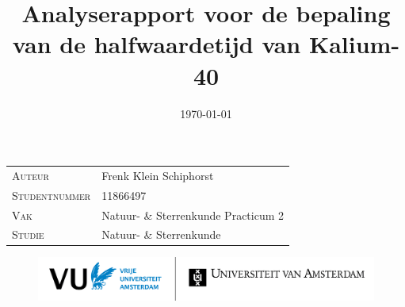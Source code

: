 \documentclass[11pt,a4paper]{article}
\title{Analyserapport voor de bepaling van de halfwaardetijd van Kalium-40} %
\date{\today}
\begin{document}
\begin{titlepage}
\maketitle
\thispagestyle{empty} %

\vfill


 \begin{table}[h]
  \label{tab:credits}
  \begin{tabular}{l l}
   \textsc{Auteur} & Frenk Klein Schiphorst \\
   \textsc{Studentnummer}  & 11866497 \\ %
   \textsc{Vak} & Natuur- \& Sterrenkunde Practicum 2 \\
   \textsc{Studie} & Natuur- \& Sterrenkunde\\
  \end{tabular}
  \vspace{3ex}
 \end{table}

\begin{figure}
  \centering  
  \includegraphics[width=150mm]{logo-combi-vu-uva-nl}\\   %
  \vspace{-13ex}
 \end{figure}

\end{titlepage}

\setcounter{page}{2}    %
\end{document}
